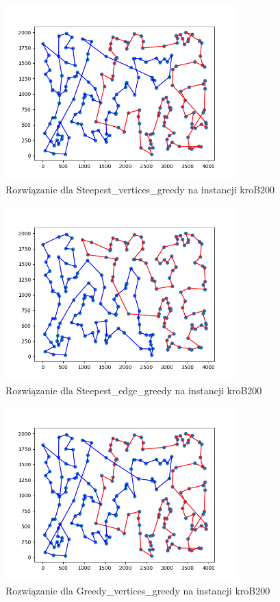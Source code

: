 \documentclass[12pt,a4paper]{article}
\begin{document}
\begin{figure}[H]
\centering
\includegraphics[width=0.8\textwidth]{figures/kroB_Steepest_V_greedy.png}
\caption{Rozwiązanie dla Steepest\_vertices\_greedy na instancji kroB200}
\end{figure}

\begin{figure}[H]
\centering
\includegraphics[width=0.8\textwidth]{figures/kroB_Steepest_E_greedy.png}
\caption{Rozwiązanie dla Steepest\_edge\_greedy na instancji kroB200}
\end{figure}

\begin{figure}[H]
\centering
\includegraphics[width=0.8\textwidth]{figures/kroB_Greedy_V_greedy.png}
\caption{Rozwiązanie dla Greedy\_vertices\_greedy na instancji kroB200}
\end{figure}
\end{document}
